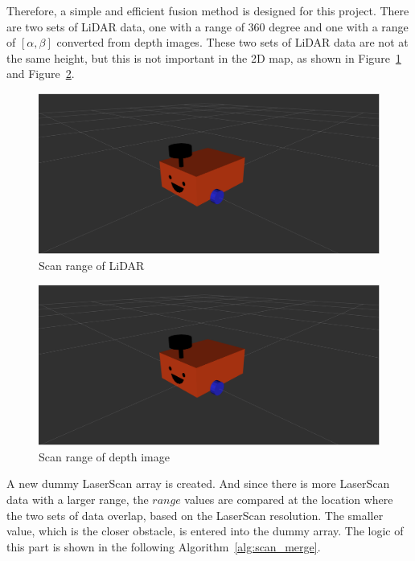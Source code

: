 Therefore, a simple and efficient fusion method is designed for this project. 
There are two sets of LiDAR data, one with a range of 360 degree and one with a range of $[\alpha,\beta]$ converted from depth images. 
These two sets of LiDAR data are not at the same height, but this is not important in the 2D map, as shown in Figure~\ref{fig:lidar_scan} and Figure~\ref{fig:depth_scan}.
\begin{figure}[H]
    \centering
    \includegraphics[width=0.8\linewidth]{figs/robot.png}
    \caption{Scan range of LiDAR}
    \label{fig:lidar_scan}
\end{figure}
\begin{figure}[H]
    \centering
    \includegraphics[width=0.8\linewidth]{figs/robot.png}
    \caption{Scan range of depth image}
    \label{fig:depth_scan}
\end{figure}
A new dummy LaserScan array is created. And since there is more LaserScan data with a larger range, 
the $range$ values are compared at the location where the two sets of data overlap, 
based on the LaserScan resolution. The smaller value, which is the closer obstacle, 
is entered into the dummy array. The logic of this part is shown in the following Algorithm~\ref{alg:scan_merge}.

